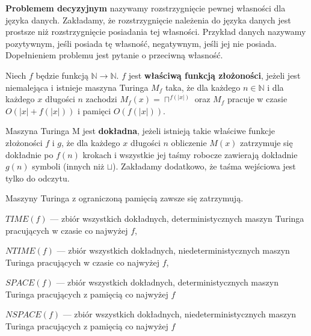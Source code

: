 \begin{definicja}
    \textbf{Problemem decyzyjnym} nazywamy rozstrzygnięcie pewnej własności dla języka danych. Zakładamy, że rozstrzygnięcie należenia do języka danych jest prostsze niż rozstrzygnięcie posiadania tej własności. Przykład danych nazywamy pozytywnym, jeśli posiada tę własność, negatywnym, jeśli jej nie posiada. Dopełnieniem problemu jest pytanie o przeciwną własność.
\end{definicja}

\begin{definicja}
    Niech $f$ będzie funkcją $\mathbb{N} \rightarrow \mathbb{N}$. $f$ jest \textbf{właściwą funkcją złożoności}, jeżeli jest niemalejąca i istnieje maszyna Turinga $M_f$ taka, że dla każdego $n \in \mathbb{N}$ i dla każdego $x$ długości $n$ zachodzi $M_f(x) = \sqcap^{f(|x|)}$ oraz $M_f$ pracuje w czasie $O(|x| + f(|x|))$ i pamięci $O(f(|x|))$.
\end{definicja}

\begin{definicja}
    Maszyna Turinga M jest \textbf{dokładna}, jeżeli istnieją takie właściwe funkcje złożoności $f$ i $g$, że dla każdego $x$ długości $n$ obliczenie $M(x)$ zatrzymuje się dokładnie po $f(n)$ krokach i wszystkie jej taśmy robocze zawierają dokładnie $g(n)$ symboli (innych niż $\sqcup$). Zakładamy dodatkowo, że taśma wejściowa jest tylko do odczytu.
\end{definicja}

\begin{lemat}
    Maszyny Turinga z ograniczoną pamięcią zawsze się zatrzymują.
\end{lemat}

\begin{definicja}
    \begin{itemize*}[label={}]
        \item $TIME(f)$ --- zbiór wszystkich dokładnych, deterministycznych maszyn Turinga pracujących w czasie co najwyżej $f$,
        \item $NTIME(f)$ --- zbiór wszystkich dokładnych, niedeterministycznych maszyn Turinga pracujących w czasie co najwyżej $f$,
        \item $SPACE(f)$ --- zbiór wszystkich dokładnych, deterministycznych maszyn Turinga pracujących z pamięcią co najwyżej $f$
        \item $NSPACE(f)$ --- zbiór wszystkich dokładnych, niedeterministycznych maszyn Turinga pracujących z pamięcią co najwyżej $f$
    \end{itemize*}
\end{definicja}

